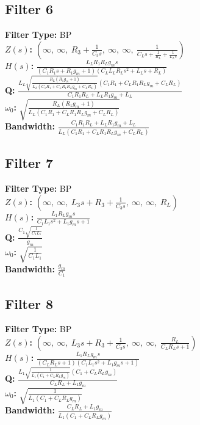 \documentclass{article}
\begin{document}
\subsection*{Filter 6}
\textbf{Filter Type:} BP \\ 
\textbf{$Z(s)$:} $\left( \infty, \  \infty, \  R_{3} + \frac{1}{C_{3} s}, \  \infty, \  \infty, \  \frac{1}{C_{L} s + \frac{1}{R_{L}} + \frac{1}{L_{L} s}}\right)$ \\ 
\textbf{$H(s)$:} $\frac{L_{L} R_{1} R_{L} g_{m} s}{\left(C_{1} R_{1} s + R_{1} g_{m} + 1\right) \left(C_{L} L_{L} R_{L} s^{2} + L_{L} s + R_{L}\right)}$ \\ 
\textbf{Q:} $\frac{L_{L} \sqrt{\frac{R_{L} \left(R_{1} g_{m} + 1\right)}{L_{L} \left(C_{1} R_{1} + C_{L} R_{1} R_{L} g_{m} + C_{L} R_{L}\right)}} \left(C_{1} R_{1} + C_{L} R_{1} R_{L} g_{m} + C_{L} R_{L}\right)}{C_{1} R_{1} R_{L} + L_{L} R_{1} g_{m} + L_{L}}$ \\ 
\textbf{$\omega_0$:} $\sqrt{\frac{R_{L} \left(R_{1} g_{m} + 1\right)}{L_{L} \left(C_{1} R_{1} + C_{L} R_{1} R_{L} g_{m} + C_{L} R_{L}\right)}}$ \\ 
\textbf{Bandwidth:} $\frac{C_{1} R_{1} R_{L} + L_{L} R_{1} g_{m} + L_{L}}{L_{L} \left(C_{1} R_{1} + C_{L} R_{1} R_{L} g_{m} + C_{L} R_{L}\right)}$ \\ 
\subsection*{Filter 7}
\textbf{Filter Type:} BP \\ 
\textbf{$Z(s)$:} $\left( \infty, \  \infty, \  L_{3} s + R_{3} + \frac{1}{C_{3} s}, \  \infty, \  \infty, \  R_{L}\right)$ \\ 
\textbf{$H(s)$:} $\frac{L_{1} R_{L} g_{m} s}{C_{1} L_{1} s^{2} + L_{1} g_{m} s + 1}$ \\ 
\textbf{Q:} $\frac{C_{1} \sqrt{\frac{1}{C_{1} L_{1}}}}{g_{m}}$ \\ 
\textbf{$\omega_0$:} $\sqrt{\frac{1}{C_{1} L_{1}}}$ \\ 
\textbf{Bandwidth:} $\frac{g_{m}}{C_{1}}$ \\ 
\subsection*{Filter 8}
\textbf{Filter Type:} BP \\ 
\textbf{$Z(s)$:} $\left( \infty, \  \infty, \  L_{3} s + R_{3} + \frac{1}{C_{3} s}, \  \infty, \  \infty, \  \frac{R_{L}}{C_{L} R_{L} s + 1}\right)$ \\ 
\textbf{$H(s)$:} $\frac{L_{1} R_{L} g_{m} s}{\left(C_{L} R_{L} s + 1\right) \left(C_{1} L_{1} s^{2} + L_{1} g_{m} s + 1\right)}$ \\ 
\textbf{Q:} $\frac{L_{1} \sqrt{\frac{1}{L_{1} \left(C_{1} + C_{L} R_{L} g_{m}\right)}} \left(C_{1} + C_{L} R_{L} g_{m}\right)}{C_{L} R_{L} + L_{1} g_{m}}$ \\ 
\textbf{$\omega_0$:} $\sqrt{\frac{1}{L_{1} \left(C_{1} + C_{L} R_{L} g_{m}\right)}}$ \\ 
\textbf{Bandwidth:} $\frac{C_{L} R_{L} + L_{1} g_{m}}{L_{1} \left(C_{1} + C_{L} R_{L} g_{m}\right)}$ \\ 
\end{document}
